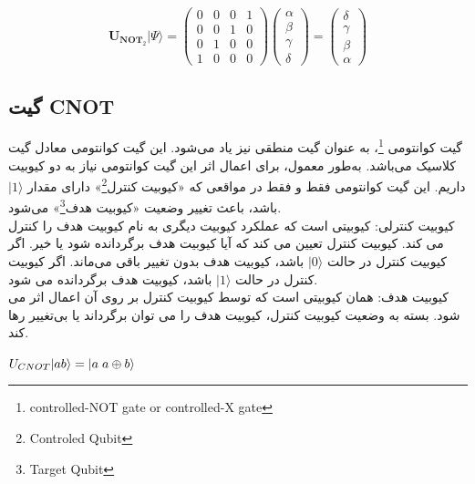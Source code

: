 \documentclass{book}
\begin{document}
\begin{center}
	$$\boldsymbol{U}_{\boldsymbol{N} \boldsymbol{O} \boldsymbol{T}_2}|\Psi\rangle=\left(\begin{array}{llll}
		0 & 0 & 0 & 1 \\
		0 & 0 & 1 & 0 \\
		0 & 1 & 0 & 0 \\
		1 & 0 & 0 & 0
	\end{array}\right)\left(\begin{array}{l}
		\alpha \\
		\beta \\
		\gamma \\
		\delta
	\end{array}\right)=\left(\begin{array}{l}
		\delta \\
		\gamma \\
		\beta \\
		\alpha
	\end{array}\right)$$
\end{center}


\subsection*{گیت CNOT}

گیت کوانتومی \footnote{ controlled-NOT gate or controlled-X gate}، به عنوان گیت منطقی نیز یاد می‌شود. این گیت کوانتومی معادل گیت  کلاسیک می‌باشد.
به‌طور معمول، برای اعمال اثر این گیت کوانتومی نیاز به دو کیوبیت داریم. این گیت کوانتومی فقط و فقط در مواقعی که «کیوبیت کنترل\footnote{Controled Qubit}» دارای مقدار $\vert 1 \rangle$ باشد، باعث تغییر وضعیت «کیوبیت هدف\footnote{Target Qubit}» می‌شود.\\

کیوبیت کنترلی: کیوبیتی است که عملکرد کیوبیت دیگری به نام کیوبیت هدف را کنترل می کند. کیوبیت کنترل تعیین می کند که آیا کیوبیت هدف برگردانده شود یا خیر. اگر کیوبیت کنترل در حالت $\vert 0 \rangle$ باشد، کیوبیت هدف بدون تغییر باقی می‌ماند. اگر کیوبیت کنترل در حالت $\vert 1 \rangle$ باشد، کیوبیت هدف برگردانده می شود.\\

کیوبیت هدف: همان کیوبیتی است که توسط کیوبیت کنترل بر روی آن اعمال اثر می شود. بسته به وضعیت کیوبیت کنترل، کیوبیت هدف را می توان برگرداند یا بی‌تغییر رها کند.\\


\begin{center}
	$U_{CNOT}\vert ab\rangle = \vert a\hspace{0.1cm} a\oplus b \rangle$
\end{center}
\end{document}
